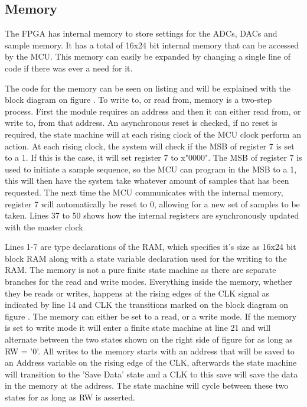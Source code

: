 \subsection{Memory} \label{subsec:Memory}
The FPGA has internal memory to store settings for the ADCs, DACs and sample memory. It has a total of 16x24 bit internal memory that can be accessed by the MCU. This memory can easily be expanded by changing a single line of code if there was ever a need for it.

The code for the memory can be seen on listing  and will be explained with the block diagram on figure . To write to, or read from, memory is a two-step process. First the module requires an address and then it can either read from, or write to, from that address. An asynchronous reset is checked, if no reset is required, the state machine will at each rising clock of the MCU clock perform an action. At each rising clock, the system will check if the MSB of register 7 is set to a 1. If this is the case, it will set register 7 to x"0000". The MSB of register 7 is used to initiate a sample sequence, so the MCU can program in the MSB to a 1, this will then have the system take whatever amount of samples that has been requested. The next time the MCU communicates with the internal memory, register 7 will automatically be reset to 0, allowing for a new set of samples to be taken. Lines 37 to 50 shows how the internal registers are synchronously updated with the  master clock



Lines 1-7 are type declarations of the RAM, which specifies it's size as 16x24 bit block RAM along with a state variable declaration used for the writing to the RAM. The memory is not a pure finite state machine as there are separate branches for the read and write modes. Everything inside the memory, whether they be reads or writes, happens at the rising edges of the CLK signal as indicated by line 14 and CLK the transitions marked on the block diagram on figure . The memory can either be set to a read, or a write mode. If the memory is set to write mode it will enter a finite state machine at line 21 and will alternate between the two states shown on the right side of figure  for as long as RW = '0'. All writes to the memory starts with an address that will be saved to an Address variable on the rising edge of the CLK, afterwards the state machine will transition to the 'Save Data' state and a CLK to this save will save the data in the memory at the address. The state machine will cycle between these two states for as long as RW is asserted. 



